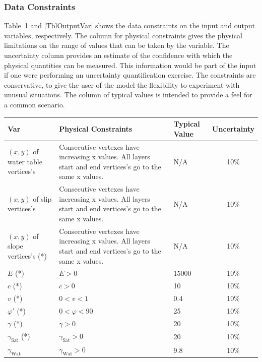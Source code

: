 \documentclass[12pt]{article}
\renewcommand{\arraystretch}{1}
\begin{document}

\subsubsection{Data Constraints} \label{sec_DataConstraints}    

Table~\ref{TblInputVar} and \ref{TblOutputVar} shows the data constraints on the input and output variables, respectively. The column for physical constraints gives the physical limitations on the range of values that can be taken by the variable. The uncertainty column provides an estimate of the confidence with which the physical quantities can be measured. This information would be part of the input if one were performing an uncertainty quantification exercise. The constraints are conservative, to give the user of the model the flexibility to experiment with unusual situations. The column of typical values is intended to provide a feel for a common scenario.

\newpage

\renewcommand{\arraystretch}{1.5}
\noindent \begin{longtable}{p{2.4cm} p{5.8cm} p{1.2cm} c}
  \toprule  \label{TblInputVar}
  \textbf{Var} & \textbf{Physical Constraints} & \textbf{Typical
    Value} & \textbf{Uncertainty}\\ \midrule
  $(x,y)$ of water table vertices's & Consecutive vertexes have
  increasing x values. All layers start and end vertices's go to the
  same x values. & N/A & 10\% \\
  $(x,y)$ of slip vertices's & Consecutive vertexes have increasing x
  values. All layers start and end vertices's go to the same x
  values. & N/A & 10\% \\
  $(x,y)$ of slope vertices's (*) & Consecutive vertexes have
  increasing x values. All layers start and end vertices's go to the
  same x values. & N/A & 10\% \\
  $E$ (*) & $E > 0$ & 15000 & 10\%\\
  $c$ (*) & $c >0$ & 10 & 10\%\\
  $v$ (*) & $ 0 < v < 1 $ & 0.4 & 10\%\\
  $\varphi'$ (*) & $ 0 < \varphi < 90 $ & 25 & 10\% \\
  $\gamma$ (*) & $\gamma > 0$ & 20 & 10\% \\
  $\gamma_{\text{Sat}}$ (*) & $\gamma_{\text{Sat}} > 0 $ & 20 & 10\%
  \\
  $\gamma_{\text{Wat}}$ & $\gamma_{\text{Wat}} > 0 $ & 9.8 & 10\% \\
  \bottomrule
\end{longtable}
\end{document}
